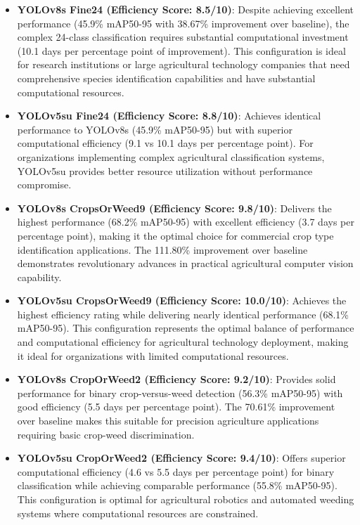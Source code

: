 \begin{itemize}
    \item \textbf{YOLOv8s Fine24 (Efficiency Score: 8.5/10)}: Despite achieving excellent performance (45.9\% mAP50-95 with 38.67\% improvement over baseline), the complex 24-class classification requires substantial computational investment (10.1 days per percentage point of improvement). This configuration is ideal for research institutions or large agricultural technology companies that need comprehensive species identification capabilities and have substantial computational resources.
    
    \item \textbf{YOLOv5su Fine24 (Efficiency Score: 8.8/10)}: Achieves identical performance to YOLOv8s (45.9\% mAP50-95) but with superior computational efficiency (9.1 vs 10.1 days per percentage point). For organizations implementing complex agricultural classification systems, YOLOv5su provides better resource utilization without performance compromise.
    
    \item \textbf{YOLOv8s CropsOrWeed9 (Efficiency Score: 9.8/10)}: Delivers the highest performance (68.2\% mAP50-95) with excellent efficiency (3.7 days per percentage point), making it the optimal choice for commercial crop type identification applications. The 111.80\% improvement over baseline demonstrates revolutionary advances in practical agricultural computer vision capability.
    
    \item \textbf{YOLOv5su CropsOrWeed9 (Efficiency Score: 10.0/10)}: Achieves the highest efficiency rating while delivering nearly identical performance (68.1\% mAP50-95). This configuration represents the optimal balance of performance and computational efficiency for agricultural technology deployment, making it ideal for organizations with limited computational resources.
    
    \item \textbf{YOLOv8s CropOrWeed2 (Efficiency Score: 9.2/10)}: Provides solid performance for binary crop-versus-weed detection (56.3\% mAP50-95) with good efficiency (5.5 days per percentage point). The 70.61\% improvement over baseline makes this suitable for precision agriculture applications requiring basic crop-weed discrimination.
    
    \item \textbf{YOLOv5su CropOrWeed2 (Efficiency Score: 9.4/10)}: Offers superior computational efficiency (4.6 vs 5.5 days per percentage point) for binary classification while achieving comparable performance (55.8\% mAP50-95). This configuration is optimal for agricultural robotics and automated weeding systems where computational resources are constrained.
    

\end{itemize}
